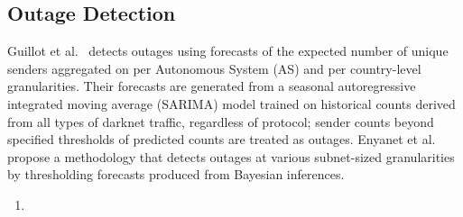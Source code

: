 \documentclass[manuscript,nonacm]{acmart}
\begin{document}
\subsection{Outage Detection}
Guillot et al.~\cite{2019guillot} detects outages using forecasts of the expected number of unique senders aggregated on per Autonomous System (AS) and per country-level granularities.
Their forecasts are generated from a seasonal autoregressive integrated moving average (SARIMA) model trained on historical counts derived from all types of darknet traffic, regardless of protocol; sender counts beyond specified thresholds of predicted counts are treated as outages.
Enyanet et al.~\cite{2024enyanet} propose a methodology that detects outages at various subnet-sized granularities by thresholding forecasts produced from Bayesian inferences.   

\begin{enumerate}
    \item 
\end{enumerate}




\end{document}
